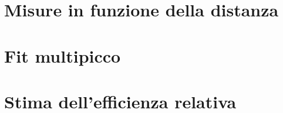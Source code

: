 \documentclass[twocolumn,10pt]{asme2ej}
\begin{document}
\section{Misure in funzione della distanza}\label{s:distanza}








\section{Fit multipicco}\label{s:multipicco}





\section{Stima dell'efficienza relativa}\label{s:efficienza}
\end{document}
